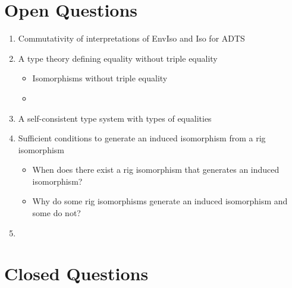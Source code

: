 \documentclass{scrartcl}
\begin{document}
\section{Open Questions}
\begin{enumerate}
  \item{Commutativity of interpretations of EnvIso and Iso for ADTS}
  \item{A type theory defining equality without triple equality}
  \begin{itemize}
    \item{Isomorphisms without triple equality}
    \item{}
  \end{itemize}
  \item{A self-consistent type system with types of equalities}
  \item{Sufficient conditions to generate an induced isomorphism from a rig isomorphism}
  \begin{itemize}
  	\item{When does there exist a rig isomorphism that generates an induced isomorphism?}
	\item{Why do some rig isomorphisms generate an induced isomorphism and some do not?}
  \end{itemize}
  \item{}
\end{enumerate}

\section{Closed Questions}
\end{document}
